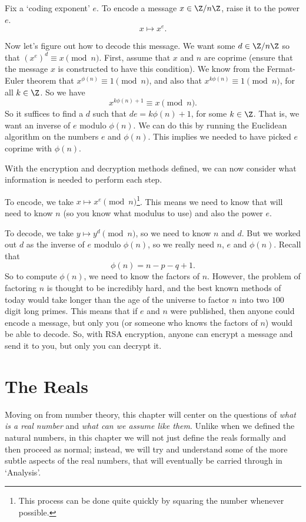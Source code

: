 Fix a `coding exponent' $e$.
To encode a message $x \in \Z/n\Z$, raise it to the power $e$.
$$
x \longmapsto x^e.
$$

Now let's figure out how to decode this message. We want some $d \in \Z/n\Z$ so that $(x^e)^d \equiv x \pmod{n}$. First, assume that $x$ and $n$ are coprime (ensure that the message $x$ is constructed to have this condition).
We know from the Fermat-Euler theorem that $x^{\phi(n)} \equiv 1 \pmod{n}$, and also that $x^{k \phi(n)} \equiv 1 \pmod{n}$, for all $k \in \Z$. So we have
$$
x^{k \phi(n) + 1} \equiv x \pmod{n}.
$$
So it suffices to find a $d$ such that $de = k \phi(n) + 1$, for some $k \in \Z$. That is, we want an inverse of $e$ modulo $\phi(n)$. We can do this by running the Euclidean algorithm on the numbers $e$ and $\phi(n)$. This implies we needed to have picked $e$ coprime with $\phi(n)$.

With the encryption and decryption methods defined, we can now consider what information is needed to perform each step.

To encode, we take $x \longmapsto x^e \pmod{n}$\footnote{This process can be done quite quickly by squaring the number whenever possible.}. This means we need to know that will need to know $n$ (so you know what modulus to use) and also the power $e$.

To decode, we take $y \longmapsto y^d \pmod{n}$, so we need to know $n$ and $d$. But we worked out $d$ as the inverse of $e$ modulo $\phi(n)$, so we really need $n$, $e$ and $\phi(n)$. Recall that
$$
\phi(n) = n - p - q + 1.
$$
So to compute $\phi(n)$, we need to know the factors of $n$.
However, the problem of factoring $n$ is thought to be incredibly hard, and the best known methods of today would take longer than the age of the universe to factor $n$ into two $100$ digit long primes. 
This means that if $e$ and $n$ were published, then anyone could encode a message, but only you (or someone who knows the factors of $n$) would be able to decode. So, with RSA encryption, anyone can encrypt a message and send it to you, but only you can decrypt it.


\section{The Reals}

Moving on from number theory, this chapter will center on the questions of \emph{what is a real number} and \emph{what can we assume like them}.
Unlike when we defined the natural numbers, in this chapter we will not just define the reals formally and then proceed as normal; instead, we will try and understand some of the more subtle aspects of the real numbers, that will eventually be carried through in `Analysis'.

